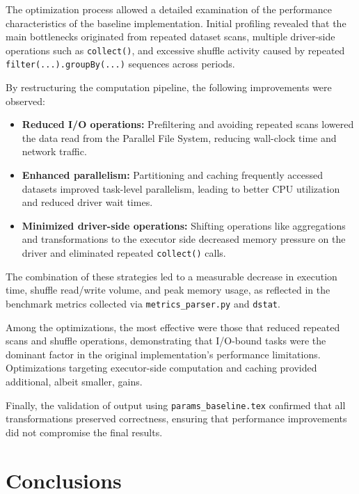 \documentclass[conference,a4paper]{IEEEtran}
\begin{document}
The optimization process allowed a detailed examination of the performance characteristics
of the baseline implementation. Initial profiling revealed that the main bottlenecks
originated from repeated dataset scans, multiple driver-side operations such as
\texttt{collect()}, and excessive shuffle activity caused by repeated
\texttt{filter(...).groupBy(...)} sequences across periods.

By restructuring the computation pipeline, the following improvements were observed:

\begin{itemize}
    \item \textbf{Reduced I/O operations:} Prefiltering and avoiding repeated scans
          lowered the data read from the Parallel File System, reducing wall-clock
          time and network traffic.
    \item \textbf{Enhanced parallelism:} Partitioning and caching frequently accessed
          datasets improved task-level parallelism, leading to better CPU utilization
          and reduced driver wait times.
    \item \textbf{Minimized driver-side operations:} Shifting operations like
          aggregations and transformations to the executor side decreased memory
          pressure on the driver and eliminated repeated \texttt{collect()} calls.
\end{itemize}

The combination of these strategies led to a measurable decrease in execution time,
shuffle read/write volume, and peak memory usage, as reflected in the benchmark metrics
collected via \texttt{metrics\_parser.py} and \texttt{dstat}.

Among the optimizations, the most effective were those that reduced repeated scans
and shuffle operations, demonstrating that I/O-bound tasks were the dominant factor
in the original implementation's performance limitations. Optimizations targeting
executor-side computation and caching provided additional, albeit smaller, gains.

Finally, the validation of output using \texttt{params\_baseline.tex} confirmed that
all transformations preserved correctness, ensuring that performance improvements
did not compromise the final results.

\section{Conclusions}
\label{sec:conclusions}
\end{document}
